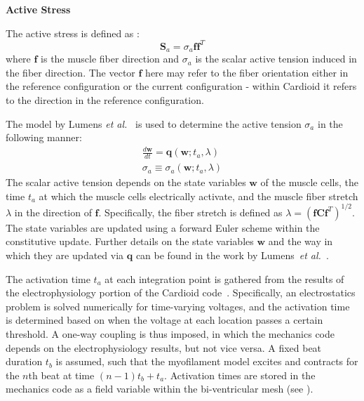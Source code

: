 \textbf{Active Stress}

The active stress is defined as :
\begin{equation}
\bm{S}_a = \sigma_a \bm{f} \bm{f}^{T}
\label{eqn:active}
\end{equation}
where $\bm{f}$ is the muscle fiber direction and ${\sigma_a}$ is the scalar active tension induced in the fiber direction. The vector $\bm{f}$ here may refer to the fiber orientation either in the reference configuration or the current configuration - within Cardioid it refers to the direction in the reference configuration.

The model by Lumens \textit{et al.}~\cite{lumens_2009} is used to determine the active tension $\sigma_a$ in the following manner:
\begin{align}
\frac{d\bm{w}}{dt} = \bm{q}(\bm{w}; t_a, \lambda) \\
\sigma_a \equiv \sigma_a(\bm{w}; t_a, \lambda)
\end{align}
The scalar active tension depends on the state variables $\bm{w}$ of the muscle cells, the time $t_a$ at which the muscle cells electrically activate, and the muscle fiber stretch $\lambda$ in the direction of $\bm{f}$. Specifically, the fiber stretch is defined as $\lambda = (\bm{f}\bm{C}\bm{f}^T)^{1/2}$. The state variables are updated using a forward Euler scheme within the constitutive update. Further details on the state variables $\bm{w}$ and the way in which they are updated via $\bm{q}$ can be found in the work by Lumens~\textit{et al.}~\cite{lumens_2009}.

The activation time $t_a$ at each integration point is gathered from the results of the electrophysiology portion of the Cardioid code~\cite{richards_2013}. Specifically, an electrostatics problem is solved numerically for time-varying voltages, and the activation time is determined based on when the voltage at each location passes a certain threshold. A one-way coupling is thus imposed, in which the mechanics code depends on the electrophysiology results, but not vice versa. A fixed beat duration $t_b$ is assumed, such that the myofilament model excites and contracts for the $n$th beat at time $(n-1)t_b + t_a$. Activation times are stored in the mechanics code as a field variable within the bi-ventricular mesh (see ).

